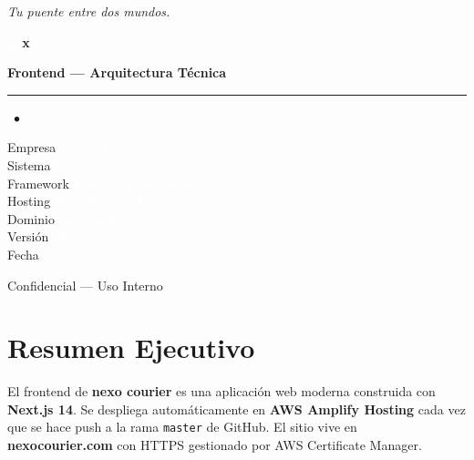 \documentclass[12pt,a4paper]{article}
\begin{document}
\begin{titlepage}
  \pagecolor{nexoBlack}
  \color{white}
  \centering
  \vspace*{3cm}

  {\large\textcolor{nexoSlate}\itshape Tu puente entre dos mundos.\par}
  \vspace{1.2cm}

  {\fontsize{52}{56}\selectfont\bfseries
    \textcolor{white}{ne}\textcolor{nexoCyan}{x}\textcolor{white}{o}\par}
  \vspace{0.4cm}
  {\LARGE\bfseries Frontend --- Arquitectura Técnica\par}

  \vspace{1.8cm}
  \textcolor{nexoCyan}{\rule{0.55\textwidth}{1.5pt}}%
  \textcolor{nexoCyan}{\large\ $\bullet$}\par

  \vspace{1.5cm}
  {\large
    \textcolor{nexoSlate}{Empresa}\quad\textcolor{white}{nexo courier (Costa Rica)} \\[0.5em]
    \textcolor{nexoSlate}{Sistema}\quad\textcolor{white}{Sitio web y panel de administración} \\[0.5em]
    \textcolor{nexoSlate}{Framework}\quad\textcolor{white}{Next.js 14 (App Router)} \\[0.5em]
    \textcolor{nexoSlate}{Hosting}\quad\textcolor{white}{AWS Amplify Hosting} \\[0.5em]
    \textcolor{nexoSlate}{Dominio}\quad\textcolor{white}{nexocourier.com} \\[0.5em]
    \textcolor{nexoSlate}{Versión}\quad\textcolor{white}{2.0} \\[0.5em]
    \textcolor{nexoSlate}{Fecha}\quad\textcolor{white}{Abril 2026}
  }

  \vfill
  {\small\textcolor{nexoSlate}{Confidencial --- Uso Interno}}
\end{titlepage}

\pagecolor{white}
\color{black}

\tableofcontents
\newpage

\section{Resumen Ejecutivo}

\begin{nexobox}
El frontend de \textbf{nexo courier} es una aplicación web moderna construida con
\textbf{Next.js 14}. Se despliega automáticamente en \textbf{AWS Amplify Hosting}
cada vez que se hace push a la rama \texttt{master} de GitHub. El sitio vive en
\textbf{nexocourier.com} con HTTPS gestionado por AWS Certificate Manager.
\end{nexobox}
\end{document}
